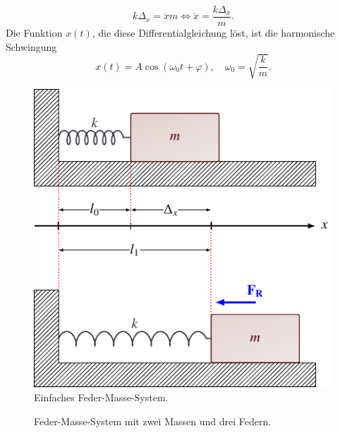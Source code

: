 \begin{equation*}
    k \Delta_x = \ddot{x} m \Leftrightarrow \ddot{x} = \frac{k \Delta_x}{m}.
\end{equation*}
Die Funktion $x(t)$, die diese Differentialgleichung löst, ist die harmonische
Schwingung
\begin{equation}
    x(t) = A \cos(\omega_0 t + \varphi), \quad \omega_0 = \sqrt{\frac{k}{m}}.
\end{equation}
\begin{figure}
    \centering
    \includegraphics{papers/kra/images/simple.pdf}
    \caption{Einfaches Feder-Masse-System.}
    \label{kra:fig:simple_mass_spring}
\end{figure}
\begin{figure}
    \centering
    
    \caption{Feder-Masse-System mit zwei Massen und drei Federn.}
    \label{kra:fig:multi_mass_spring}
\end{figure}

